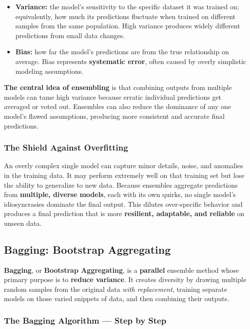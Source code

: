 \documentclass[12pt,openany]{book}
\begin{document}
\begin{itemize}[leftmargin=*]
    \item \textbf{Variance:} the model's sensitivity to the specific dataset it was trained on; equivalently, how much its predictions fluctuate when trained on different samples from the same population. High variance produces widely different predictions from small data changes.
    \item \textbf{Bias:} how far the model's predictions are from the true relationship on average. Bias represents \textbf{systematic error}, often caused by overly simplistic modeling assumptions.
\end{itemize}

\textbf{The central idea of ensembling} is that combining outputs from multiple models can tame high variance because erratic individual predictions get averaged or voted out. Ensembles can also reduce the dominance of any one model's flawed assumptions, producing more consistent and accurate final predictions.

\subsubsection{The Shield Against Overfitting}

An overly complex single model can capture minor details, noise, and anomalies in the training data. It may perform extremely well on that training set but lose the ability to generalize to new data. Because ensembles aggregate predictions from \textbf{multiple, diverse models}, each with its own quirks, no single model's idiosyncrasies dominate the final output. This dilutes over-specific behavior and produces a final prediction that is more \textbf{resilient, adaptable, and reliable} on unseen data.

\subsection{Bagging: Bootstrap Aggregating}

\textbf{Bagging}, or \textbf{Bootstrap Aggregating}, is a \textbf{parallel} ensemble method whose primary purpose is to \textbf{reduce variance}. It creates diversity by drawing multiple random samples from the original data \textit{with replacement}, training separate models on those varied snippets of data, and then combining their outputs.

\subsubsection{The Bagging Algorithm --- Step by Step}
\end{document}
